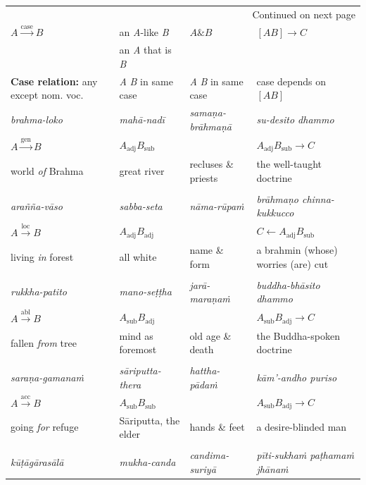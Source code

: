 \documentclass[11pt,oneside]{memoir}
\begin{document}
\begin{minipage}{\linewidth+10pt}
\begin{longtable}{llll}
\hline
\endhead
\hline\multicolumn{4}{r}{Continued on next page} \\
\endfoot
\endlastfoot
\hline
\(A \xrightarrow{\text{case}} B\) & an \emph{A}-like \emph{B} & \(A \mathbin{\&} B\) & \([A B] \rightarrow C\)\\
 & an \emph{A} that is \emph{B} &  & \\
\hline
\textbf{Case relation:} any except nom. voc. & \emph{A} \emph{B} in same case & \emph{A} \emph{B} in same case & case depends on \([A B]\)\\
\hline
\hline
\emph{brahma-loko} & \emph{mahā-nadī} & \emph{samaṇa-brāhmaṇā} & \emph{su-desito dhammo}\\
\(A \xrightarrow{\text{gen}} B\) & \(A_{\text{adj}} B_{\text{sub}}\) &  & \(A_{\text{adj}} B_{\text{sub}} \rightarrow C\)\\
world \emph{of} Brahma & great river & recluses \& priests & the well-taught doctrine\\
 &  &  & \\
\hline
\emph{arañña-vāso} & \emph{sabba-seta} & \emph{nāma-rūpaṁ} & \emph{brāhmaṇo chinna-kukkucco}\\
\(A \xrightarrow{\text{loc}} B\) & \(A_{\text{adj}} B_{\text{adj}}\) &  & \(C \leftarrow A_{\text{adj}} B_{\text{sub}}\)\\
living \emph{in} forest & all white & name \& form & a brahmin (whose) worries (are) cut\\
 &  &  & \\
\hline
\emph{rukkha-patito} & \emph{mano-seṭṭha} & \emph{jarā-maraṇaṁ} & \emph{buddha-bhāsito dhammo}\\
\(A \xrightarrow{\text{abl}} B\) & \(A_{\text{sub}} B_{\text{adj}}\) &  & \(A_{\text{sub}} B_{\text{adj}} \rightarrow C\)\\
fallen \emph{from} tree & mind as foremost & old age \& death & the Buddha-spoken doctrine\\
 &  &  & \\
\hline
\emph{saraṇa-gamanaṁ} & \emph{sāriputta-thera} & \emph{hattha-pādaṁ} & \emph{kām'-andho puriso}\\
\(A \xrightarrow{\text{acc}} B\) & \(A_{\text{sub}} B_{\text{sub}}\) &  & \(A_{\text{sub}} B_{\text{adj}} \rightarrow C\)\\
going \emph{for} refuge & Sāriputta, the elder & hands \& feet & a desire-blinded man\\
 &  &  & \\
\hline
\emph{kūṭāgārasālā} & \emph{mukha-canda} & \emph{candima-suriyā} & \emph{pīti-sukhaṁ paṭhamaṁ jhānaṁ}\\

\end{longtable}
\end{minipage}
\end{document}
